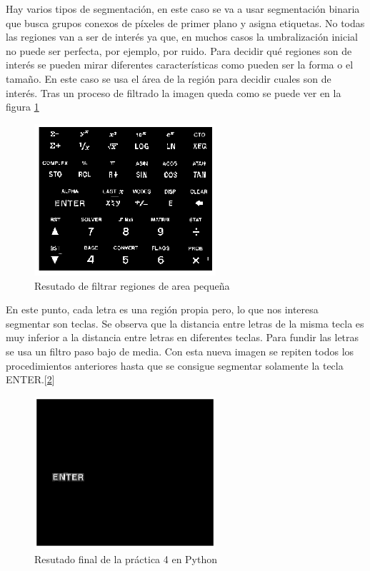 \documentclass[a4paper,12pt]{report}
\begin{document}
Hay varios tipos de segmentación, en este caso se va a usar segmentación binaria que busca grupos conexos de píxeles de primer plano y asigna etiquetas. No todas las regiones van a ser de interés ya que, en muchos casos la umbralización inicial no puede ser perfecta, por ejemplo, por ruido. Para decidir qué regiones son de interés se pueden mirar diferentes características como pueden ser la forma o el tamaño. En este caso se usa el área de la región para decidir cuales son de interés. Tras un proceso de filtrado la imagen queda como se puede ver en la figura \ref{filtersmallareas}\\


\begin{figure}[h]
\centering
\includegraphics[width=0.6\textwidth]{imagenes/filtersmallareas}
\caption{Resutado de filtrar regiones de area pequeña}
\label{filtersmallareas}
\end{figure}

En este punto, cada letra es una región propia pero, lo que nos interesa segmentar son teclas. Se observa que la distancia entre letras de la misma tecla es muy inferior a la distancia entre letras en diferentes teclas. Para fundir las letras se usa un filtro paso bajo de media. Con esta nueva imagen se repiten todos los procedimientos anteriores hasta que se consigue segmentar solamente la tecla ENTER.[\ref{finp4}]

\begin{figure}[h]
\centering
\includegraphics[width=0.6\textwidth]{imagenes/finp4}
\caption{Resutado final de la práctica 4 en Python}
\label{finp4}
\end{figure}
\end{document}
